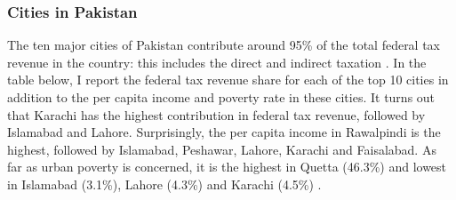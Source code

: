 \documentclass[12pt]{article}
\newcommand{\1}{\mathbbm 1}
\begin{document}
		
		
		
		
		
		
		
		  
	
	

		\subsubsection{Cities in Pakistan}
		
		The ten major cities of Pakistan contribute around 95\% of the total federal tax revenue in the country: this includes the direct and indirect taxation \cite{UNHabitat2018}. In the table below, I report the federal tax revenue share for each of the top 10 cities in addition to the per capita income and poverty rate in these cities. It turns out that Karachi has the highest contribution in federal tax revenue, followed by Islamabad and Lahore. Surprisingly, the per capita income in Rawalpindi is the highest, followed by Islamabad, Peshawar, Lahore, Karachi and Faisalabad. As far as urban poverty is concerned, it is the highest in Quetta (46.3\%) and lowest in Islamabad (3.1\%), Lahore (4.3\%) and Karachi (4.5\%) \cite{UNHabitat2018}.
		
		
		
\end{document}
